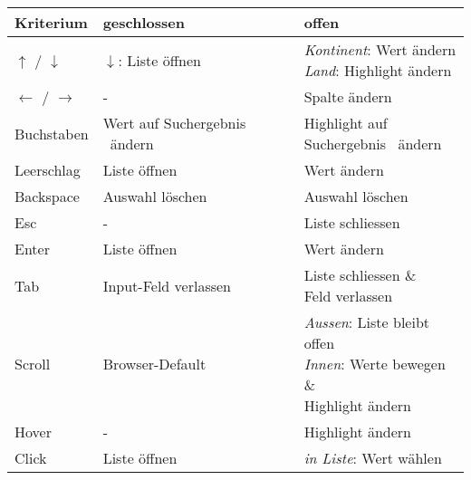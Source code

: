 \begin{table}[!htb]
    \label{table:interactionCountryInput}
    \footnotesize
    \begin{adjustbox}{max width=\textwidth}
        \begin{threeparttable}
            \begin{tabular}{ l || l | l }
                \bf{Kriterium}    & \bf{geschlossen} & \bf{offen} \\
                \hline \hline
                $\uparrow$ / $\downarrow$     & \emph{$\downarrow$}: Liste öffnen & \tbbr{\emph{Kontinent}: Wert ändern \\ \emph{Land}: Highlight ändern } \\
                \hline
                $\leftarrow$ / $\rightarrow$  & -                                 & Spalte ändern \\
                \hline
                Buchstaben  & Wert auf Suchergebnis\tnote{1} \ ändern & \tbbr{Highlight auf \\ Suchergebnis\tnote{1} \ ändern} \\
                \hline
                Leerschlag  & Liste öffnen    & Wert ändern       \\
                \hline
                Backspace   & Auswahl löschen & Auswahl löschen   \\
                \hline
                Esc         & -               & Liste schliessen  \\
                \hline \hline
                Enter       & Liste öffnen    & Wert ändern       \\
                \hline
                Tab         & Input-Feld verlassen            & \tbbr{Liste schliessen \& \\ Feld verlassen } \\
                \hline \hline
                Scroll     & Browser-Default\tnote{2}         & \tbbr{\emph{Aussen}: Liste bleibt offen \\
                                                                    \emph{Innen}: Werte bewegen \& \\ Highlight ändern} \\
                \hline
                Hover      & -                & Highlight ändern \\
                \hline
                Click      & Liste öffnen     & \tbbr{\emph{in Liste}: Wert wählen \\
}
\end{tabular}
\end{threeparttable}
\end{adjustbox}
\end{table}
